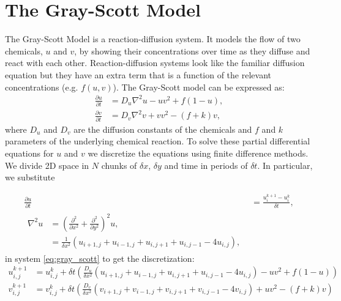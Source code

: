\documentclass[a4paper]{article}
\begin{document}
\section{The Gray-Scott Model}
The Gray-Scott Model is a reaction-diffusion system. It models the flow of two chemicals, $u$ and $v$, by showing their concentrations over time as they diffuse and react with each other. Reaction-diffusion systems look like the familiar diffusion equation but they have an extra term that is a function of the relevant concentrations (e.g. $f(u, v)$). The Gray-Scott model can be expressed as:
\begin{equation} \label{eq:gray_scott}
\begin{aligned} 
    \frac{\partial u}{\partial t} &= D_u \nabla^2 u - uv^2 + f(1 - u),  \\
    \frac{\partial v}{\partial t} &= D_v \nabla^2 v + vv^2 - (f + k) v,
\end{aligned}
\end{equation}  
where $D_u$ and $D_v$ are the diffusion constants of the chemicals and $f$ and $k$ parameters of the underlying chemical reaction. To solve these partial differential equations for $u$ and $v$ we discretize the equations using finite difference methods. We divide 2D space in $N$ chunks of $\delta x$, $\delta y$ and time in periods of $\delta t$. In particular, we substitute 

\begin{align*}
    \frac{\partial u}{\partial t} &= \frac{u^{k+1}_i - u^k_i}{\delta t}, \\
    \begin{split}
        \nabla^2 u &= \left( \frac{\partial^2}{\partial x^2} + \frac{\partial^2}{\partial y^2} \right)^2 u, \\
        &= \frac{1}{\delta x^2} (u_{i+1,j} + u_{i-1,j} + u_{i,j+1} + u_{i,j-1} - 4 u_{i,j}),
    \end{split}
\end{align*}
in system \ref{eq:gray_scott} to get the discretization:
\begin{equation*} \label{eq:gray_scott_discrete}
\begin{aligned} 
    u^{k+1}_{i,j} &= u^k_{i,j} + \delta t \left(\frac{D_u}{\delta x^2} (u_{i+1,j} + u_{i-1,j} + u_{i,j+1} + u_{i,j-1} - 4 u_{i,j}) - uv^2 + f(1-u) \right) \\
    v^{k+1}_{i,j} &= v^k_{i,j} + \delta t \left(\frac{D_v}{\delta x^2} (v_{i+1,j} + v_{i-1,j} + v_{i,j+1} + v_{i,j-1} - 4 v_{i,j}) + uv^2 - (f + k) v \right)
\end{aligned}
\end{equation*}  
\end{document}
